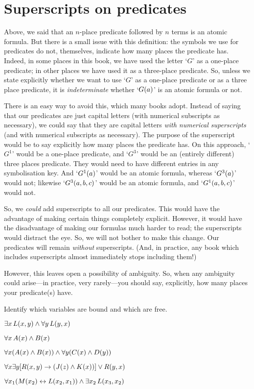 \section{Superscripts on predicates}
Above, we said that an $n$-place predicate followed by $n$ terms is an atomic formula. But there is a small issue with this definition: the symbols we use for predicates do not, themselves, indicate how many places the predicate has. Indeed, in some places in this book, we have used the letter `$G$' as a one-place predicate; in other places we have used it as a three-place predicate. So, unless we state explicitly whether we want to use `$G$' as a one-place predicate or as a three place predicate, it is \emph{indeterminate} whether `$\mathord{G}(a)$' is an atomic formula or not.

There is an easy way to avoid this, which many books adopt. Instead of saying that our predicates are just capital letters (with numerical subscripts as necessary), we could say that they are capital letters \emph{with numerical superscripts} (and with numerical subscripts as necessary). The purpose of the superscript would be to say explicitly how many places the predicate has. On this approach, `$G^1$' would be a one-place predicate, and `$G^3$' would be an (entirely different) three places predicate. They would need to have different entries in any symbolisation key. And `$\mathord{G^1}(a)$' would be an atomic formula, whereas `$\mathord{G^3}(a)$' would not; likewise `$\mathord{G^3}(a,b,c)$' would be an atomic formula, and `$\mathord{G^1}(a,b,c)$' would not. 

So, we \emph{could} add superscripts to all our predicates. This would have the advantage of making certain things completely explicit. However, it would have the disadvantage of making our formulas much harder to read; the superscripts would distract the eye. So, we will not bother to make this change. Our predicates will remain \emph{without} superscripts.  (And, in practice, any book which includes superscripts almost immediately stops including them!)

However, this leaves open a possibility of ambiguity. So, when any ambiguity could arise---in practice, very rarely---you should say, explicitly, how many places your predicate(s) have. 

\practiceproblems
\problempart
\label{pr.freeFOL}
Identify which variables are bound and which are free.
\begin{earg}
\item $\exists x\, \mathord{L}(x,y) \wedge \forall y\, \mathord{L}(y,x)$
\item $\forall x\, \mathord{A}(x) \wedge \mathord{B}(x)$
\item $\forall x (\mathord{A}(x) \wedge \mathord{B}(x)) \wedge \forall y(\mathord{C}(x) \wedge \mathord{D}(y))$
\item $\forall x\exists y[\mathord{R}(x,y) \rightarrow (\mathord{J}(z) \wedge \mathord{K}(x))] \vee \mathord{R}(y,x)$
\item $\forall x_1(\mathord{M}(x_2) \leftrightarrow \mathord{L}(x_2,x_1)) \wedge \exists x_2\,\mathord{L}(x_3,x_2)$
\end{earg}


